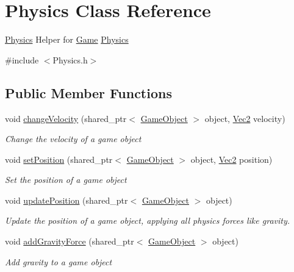 \hypertarget{class_physics}{}\section{Physics Class Reference}
\label{class_physics}


\mbox{\hyperlink{class_physics}{Physics}} Helper for \mbox{\hyperlink{class_game}{Game}} \mbox{\hyperlink{class_physics}{Physics}}  




{\ttfamily \#include $<$Physics.\+h$>$}

\subsection*{Public Member Functions}
\begin{DoxyCompactItemize}
\item 
void \mbox{\hyperlink{class_physics_a3baa430406c9017c1de92ed9c35dc9a2}{change\+Velocity}} (shared\+\_\+ptr$<$ \mbox{\hyperlink{class_game_object}{Game\+Object}} $>$ object, \mbox{\hyperlink{struct_vec2}{Vec2}} velocity)
\begin{DoxyCompactList}\small\item\em Change the velocity of a game object \end{DoxyCompactList}\item 
void \mbox{\hyperlink{class_physics_aef3b1d8a37d4eea381dfe48779188b38}{set\+Position}} (shared\+\_\+ptr$<$ \mbox{\hyperlink{class_game_object}{Game\+Object}} $>$ object, \mbox{\hyperlink{struct_vec2}{Vec2}} position)
\begin{DoxyCompactList}\small\item\em Set the position of a game object \end{DoxyCompactList}\item 
void \mbox{\hyperlink{class_physics_acd65e09cdd0dbb9648956c8d174bb621}{update\+Position}} (shared\+\_\+ptr$<$ \mbox{\hyperlink{class_game_object}{Game\+Object}} $>$ object)
\begin{DoxyCompactList}\small\item\em Update the position of a game object, applying all physics forces like gravity. \end{DoxyCompactList}\item 
void \mbox{\hyperlink{class_physics_a00639bda7da3c9e8c8b726de6104c64d}{add\+Gravity\+Force}} (shared\+\_\+ptr$<$ \mbox{\hyperlink{class_game_object}{Game\+Object}} $>$ object)
\begin{DoxyCompactList}\small\item\em Add gravity to a game object \end{DoxyCompactList}\end{DoxyCompactItemize}


